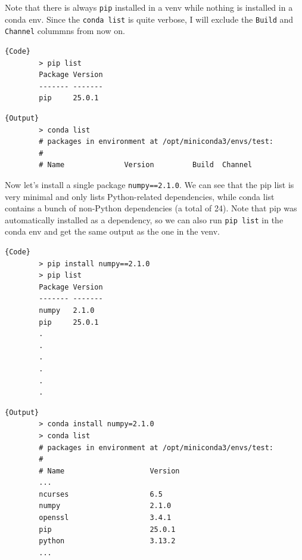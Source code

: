   \begin{example}
    \label{ex:fresh-environment}
    Note that there is always \texttt{pip} installed in a venv while nothing is installed in a conda env. Since the \texttt{conda list} is quite verbose, I will exclude the \texttt{Build} and \texttt{Channel} colummns from now on. 

    \noindent\begin{minipage}{.25\textwidth}
      \begin{lstlisting}[]{Code}
        > pip list
        Package Version
        ------- -------
        pip     25.0.1 
      \end{lstlisting}
      \end{minipage}
      \hfill
      \begin{minipage}{.74\textwidth}
      \begin{lstlisting}[]{Output}
        > conda list
        # packages in environment at /opt/miniconda3/envs/test:
        #
        # Name              Version         Build  Channel 
      \end{lstlisting}
    \end{minipage}
  \end{example}

  \begin{example}
    \label{ex:dependency-installation-when-installing-a}
    Now let's install a single package \texttt{numpy==2.1.0}. We can see that the pip list is very minimal and only lists Python-related dependencies, while conda list contains a bunch of non-Python dependencies (a total of 24). Note that pip was automatically installed as a dependency, so we can also run \texttt{pip list} in the conda env and get the same output as the one in the venv.  
    
    \noindent\begin{minipage}{.35\textwidth}
      \begin{lstlisting}[]{Code} 
        > pip install numpy==2.1.0
        > pip list
        Package Version
        ------- -------
        numpy   2.1.0
        pip     25.0.1
        .
        .
        .
        .
        .
        .
      \end{lstlisting}
      \end{minipage}
      \hfill
      \begin{minipage}{.64\textwidth}
      \begin{lstlisting}[]{Output}
        > conda install numpy=2.1.0
        > conda list
        # packages in environment at /opt/miniconda3/envs/test:
        #
        # Name                    Version      
        ...
        ncurses                   6.5         
        numpy                     2.1.0       
        openssl                   3.4.1       
        pip                       25.0.1      
        python                    3.13.2      
        ...
      \end{lstlisting}
    \end{minipage}
  \end{example}

